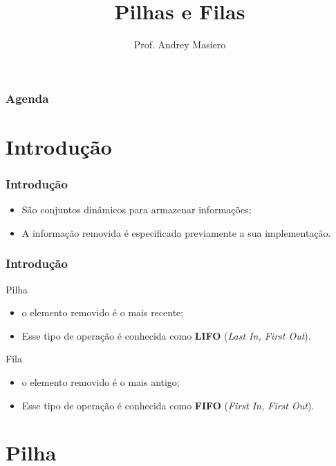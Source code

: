 \documentclass{beamer}
\begin{document}
\title[Pilhas e Filas]{Pilhas e Filas}
\author{Prof. Andrey Masiero}

\begin{frame}
  \titlepage
\end{frame}

\begin{frame}
  \frametitle{Agenda}
  \tableofcontents
\end{frame}

\section{Introdução}

\begin{frame}
	\frametitle{Introdução}
    \begin{itemize}
        \item São conjuntos dinâmicos para armazenar informações;
        \item A informação removida é especificada previamente a sua implementação.
    \end{itemize}
\end{frame}

\begin{frame}
	\frametitle{Introdução}
    \begin{block}{Pilha}
        \begin{itemize}
            \item o elemento removido é o mais recente;
            \item Esse tipo de operação é conhecida como \textbf{LIFO} (\textit{Last In, First Out}).
        \end{itemize}
	\end{block}

    \begin{block}{Fila}
        \begin{itemize}
            \item o elemento removido é o mais antigo;
            \item Esse tipo de operação é conhecida como \textbf{FIFO} (\textit{First In, First Out}).
        \end{itemize}
	\end{block}
\end{frame}

\section{Pilha}
\end{document}
